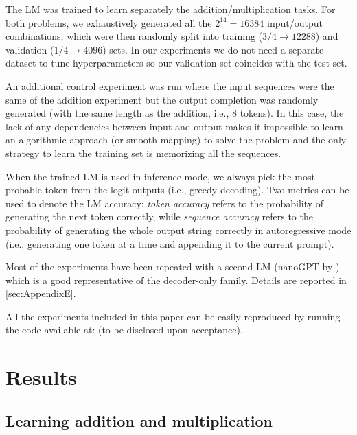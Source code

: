 \documentclass[final,1p,times,authoryear]{elsarticle}
\begin{document}
The LM was trained to learn separately the addition/multiplication tasks. For both problems, we exhaustively generated all the $2^{14}=16384$ input/output combinations, which were then randomly split into training ($3/4 \rightarrow 12288$) and validation ($1/4 \rightarrow 4096$) sets. In our experiments we do not need a separate dataset to tune hyperparameters so our validation set coincides with the test set.

An additional control experiment was run where the input sequences were the same of the addition experiment but the output completion was randomly generated (with the same length as the addition, i.e., 8 tokens). In this case, the lack of any dependencies between input and output makes it impossible to learn an algorithmic approach (or smooth mapping) to solve the problem and the only strategy to learn the training set is memorizing all the sequences.

When the trained LM is used in inference mode, we always pick the most probable token from the logit outputs (i.e., greedy decoding). Two metrics can be used to denote the LM accuracy: \textit{token accuracy} refers to the probability of generating the next token correctly, while \textit{sequence accuracy} refers to the probability of generating the whole output string correctly in autoregressive mode (i.e., generating one token at a time and appending it to the current prompt).

Most of the experiments have been repeated with a second LM (nanoGPT by \citet{Karpathy2022}) which is a good representative of the decoder-only family. Details are reported in \ref{sec:AppendixE}.

All the experiments included in this paper can be easily reproduced by running the code available at: (to be disclosed upon acceptance).

\section{Results} \label{sec:Results}

\subsection{Learning addition and multiplication} \label{subsec:LearningAdditionAndMultiplication}
\end{document}
